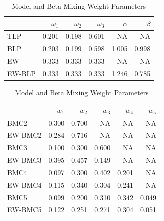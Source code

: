 \documentclass[
]{article}
\begin{document}
\begin{table}[H]
\caption{\label{tab:unnamed-chunk-12}Model and Beta Mixing Weight Parameters}

\centering
\fontsize{8}{10}\selectfont
\begin{tabular}[t]{lrrrrr}
\toprule
  & $\omega_1$ & $\omega_2$ & $\omega_3$ & $\alpha$ & $\beta$\\
\midrule
TLP & 0.201 & 0.198 & 0.601 & NA & NA\\
BLP & 0.203 & 0.199 & 0.598 & 1.005 & 0.998\\
EW & 0.333 & 0.333 & 0.333 & NA & NA\\
EW-BLP & 0.333 & 0.333 & 0.333 & 1.246 & 0.785\\
\bottomrule
\end{tabular}
\centering
\begin{tabular}[t]{lrrrrr}
\toprule
  & $w_1$ & $w_2$ & $w_3$ & $w_4$ & $w_5$\\
\midrule
BMC2 & 0.300 & 0.700 & NA & NA & NA\\
EW-BMC2 & 0.284 & 0.716 & NA & NA & NA\\
BMC3 & 0.100 & 0.300 & 0.600 & NA & NA\\
EW-BMC3 & 0.395 & 0.457 & 0.149 & NA & NA\\
BMC4 & 0.097 & 0.300 & 0.402 & 0.201 & NA\\
\addlinespace
EW-BMC4 & 0.115 & 0.340 & 0.304 & 0.241 & NA\\
BMC5 & 0.099 & 0.200 & 0.310 & 0.342 & 0.049\\
EW-BMC5 & 0.122 & 0.251 & 0.271 & 0.304 & 0.051\\
\bottomrule
\end{tabular}
\end{table}
\end{document}
